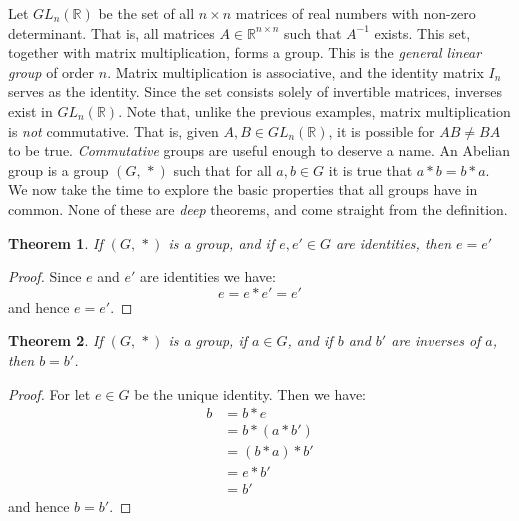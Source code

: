 \documentclass{article}
\theoremstyle{plain}
\newtheorem{theorem}{Theorem}[section]
\theoremstyle{normal}
\newenvironment{example}{%
    \pushQED{\qed}\renewcommand{\qedsymbol}{$\blacksquare$}\examplex%
}{%
    \popQED\endexamplex%
}
\newenvironment{definition}{%
    \pushQED{\qed}\renewcommand{\qedsymbol}{$\blacksquare$}\definitionx%
}{%
    \popQED\enddefinitionx%
}
\begin{document}
        \begin{example}
            Let $GL_{n}(\mathbb{R})$ be the set of all $n\times{n}$ matrices
            of real numbers with non-zero determinant. That is, all matrices
            $A\in\mathbb{R}^{n\times{n}}$ such that $A^{-1}$ exists. This
            set, together with matrix multiplication, forms a group. This is
            the \textit{general linear group} of order $n$. Matrix
            multiplication is associative, and the identity matrix $I_{n}$
            serves as the identity. Since the set consists solely of invertible
            matrices, inverses exist in $GL_{n}(\mathbb{R})$. Note that, unlike
            the previous examples, matrix multiplication is \textit{not}
            commutative. That is, given $A,B\in{GL}_{n}(\mathbb{R})$, it is
            possible for $AB\ne{BA}$ to be true.
        \end{example}
        \textit{Commutative} groups are useful enough to deserve a name.
        \begin{definition}[\textbf{Abelian Group}]
            An Abelian group is a group $(G,\,*)$ such that for all $a,b\in{G}$
            it is true that $a*b=b*a$.
        \end{definition}
        We now take the time to explore the basic properties that all groups
        have in common. None of these are \textit{deep} theorems, and come
        straight from the definition.
        \begin{theorem}
            If $(G,\,*)$ is a group, and if $e,e'\in{G}$ are identities, then
            $e=e'$
        \end{theorem}
        \begin{proof}
            Since $e$ and $e'$ are identities we have:
            \begin{equation}
                e=e*e'=e'
            \end{equation}
            and hence $e=e'$.
        \end{proof}
        \begin{theorem}
            If $(G,\,*)$ is a group, if $a\in{G}$, and if $b$ and $b'$ are
            inverses of $a$, then $b=b'$.
        \end{theorem}
        \begin{proof}
            For let $e\in{G}$ be the unique identity. Then we have:
            \begin{align}
                b&=b*e\tag{Identity}\\
                &=b*(a*b')\tag{Inverse}\\
                &=(b*a)*b'\tag{Associativity}\\
                &=e*b'\tag{Inverse}\\
                &=b'\tag{Identity}
            \end{align}
            and hence $b=b'$.
        \end{proof}
\end{document}

